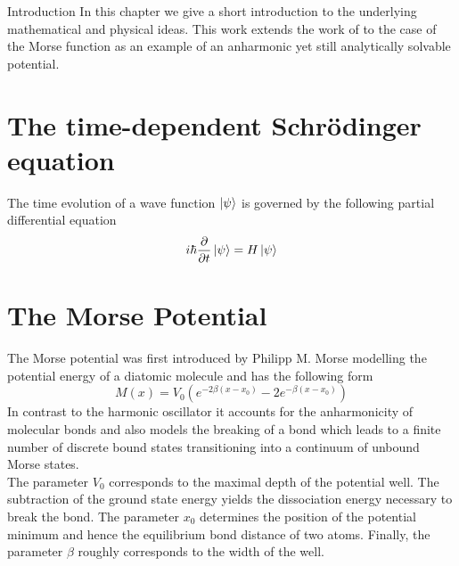 \begin{chapter}{Introduction}
\label{ch:introduction}
In this chapter we give a short introduction to the underlying mathematical and physical ideas.
This work extends the work of \cite{FGL_semiclassical_dynamics} to the case of the Morse function as an example of an anharmonic yet still analytically solvable potential.\\


\section{The time-dependent Schrödinger equation} %
\label{sec:The time-dependent Schroedinger equation}
The time evolution of a wave function $\ket{\psi}$ is governed by the following partial differential equation
\begin{equation}
    i\hbar\frac{\partial }{\partial t}\ket{\psi}=H\ket{\psi}
\end{equation}



\section{The Morse Potential} %
\label{sec:morse_potential}
The Morse potential was first introduced by Philipp M. Morse \cite{PMMorse} modelling the potential energy of a diatomic molecule and has the following form
\begin{equation}
    M(x)=V_0(e^{-2\beta(x-x_0)}-2e^{-\beta(x-x_0)})
\end{equation}
In contrast to the harmonic oscillator it accounts for the anharmonicity of molecular bonds and also models the breaking of a bond which leads to a finite
number of discrete bound states transitioning into a continuum of unbound Morse states.\\

The parameter $V_0$ corresponds to the maximal depth of the potential well. The subtraction of the ground state energy yields
the dissociation energy necessary to break the bond. The parameter $x_0$ determines the position of the potential minimum and hence the equilibrium bond
distance of two atoms. Finally, the parameter $\beta$ roughly corresponds to the width of the well.  \\




\end{chapter}
